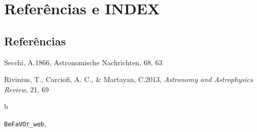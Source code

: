 \documentclass[letterpaper,10pt,english]{sphinxmanual}
\begin{document}
\chapter{Referências e INDEX}
\label{index:referencias-e-index}

\section{Referências}
\label{index:referencias}
Secchi, A.1866, Astronomische Nachrichten, 68, 63

Rivinius, T., Carciofi, A. C., \& Martayan, C.2013, \emph{Astronomy and Astrophysics Review}, 21, 69


\renewcommand{\indexname}{Python Module Index}
\begin{theindex}
\def\bigletter#1{{\Large\sffamily#1}\nopagebreak\vspace{1mm}}
\bigletter{b}
\item {\texttt{BeFaVOr\_web}}, \pageref{index:module-BeFaVOr_web}
\end{theindex}

\renewcommand{\indexname}{Index}
\printindex
\end{document}
